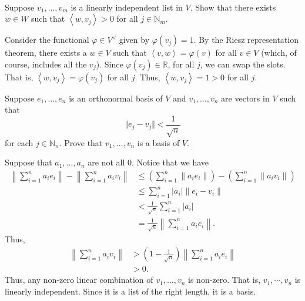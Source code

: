 \documentclass[12pt, letterpaper]{hmcpset}
\begin{document}
\begin{solution}~
	
\end{solution}

\pagebreak

\begin{problem}[13.]
	Suppose $v_1, \dots, v_m$ is a linearly independent list in $V$. Show that there exists $w \in W$ such that $\left < w, v_j \right > > 0$ for all $j \in \mathbb N_m$.
\end{problem}

\begin{solution}
	Consider the functional $\varphi \in V^{\vee}$ given by $\varphi(v_{j}) = 1$. By the Riesz representation theorem, there exists a $w \in V$ such that $\left < v, w \right > = \varphi(v)$ for all $v \in V$ (which, of course, includes all the $v_{j}$). Since $\varphi(v_{j}) \in \mathbb{R}$, for all $j$, we can swap the slots. That is, $\left < w, v_{j} \right > = \varphi(v_{j})$ for all $j$. Thus, $\left < w, v_{j} \right > = 1 > 0$ for all $j$.
\end{solution}

\pagebreak

\begin{problem}[14.]
	Suppose $e_1, \dots, e_n$ is an orthonormal basis of $V$ and $v_1, \dots, v_n$ are vectors in $V$ such that
	\[
		\Vert e_j - v_j \Vert < \frac{1}{\sqrt n}
	\]
	for each $j \in \mathbb N_n$. Prove that $v_1, \dots, v_n$ is a basis of $V$.
\end{problem}

\begin{solution}
	Suppose that $a_{1}, \dots, a_{n}$ are not all $0$. Notice that we have
	\[
		\begin{split}
			\left \lVert \sum_{i = 1}^{n} a_{i} e_{i} \right \rVert - \left \lVert \sum_{i = 1}^{n} a_{i} v_{i} \right \rVert & \le \left ( \sum_{i = 1}^{n} \lVert a_{i} e_{i} \rVert \right ) - \left ( \sum_{i = 1}^{n} \lVert a_{i} v_{i} \rVert \right ) \\
																	  & \le \sum_{i = 1}^{n} \lvert a_{i} \rvert \lVert e_{i} - v_{i} \rVert \\
																	  & < \frac{1}{\sqrt{n}} \sum_{i = 1}^{n} \lvert a_{i} \rvert \\
																	  & = \frac{1}{\sqrt n} \left \lVert \sum_{i = 1}^{n} a_{i} e_{i} \right \rVert.
		\end{split}
	\]
	Thus,
	\[
		\begin{split}
			\left \lVert \sum_{i = 1}^{n} a_{i} v_{i} \right \rVert & > \left ( 1 - \frac{1}{\sqrt n} \right ) \left \lVert \sum_{i = 1}^{n} a_{i} e_{i} \right \rVert \\
										& > 0.
		\end{split}
	\]
	Thus, any non-zero linear combination of $v_{1}, \dots, v_{n}$ is non-zero. That is, $v_{1}, \cdots, v_{n}$ is linearly independent. Since it is a list of the right length, it is a basis.
\end{solution}
\end{document}
